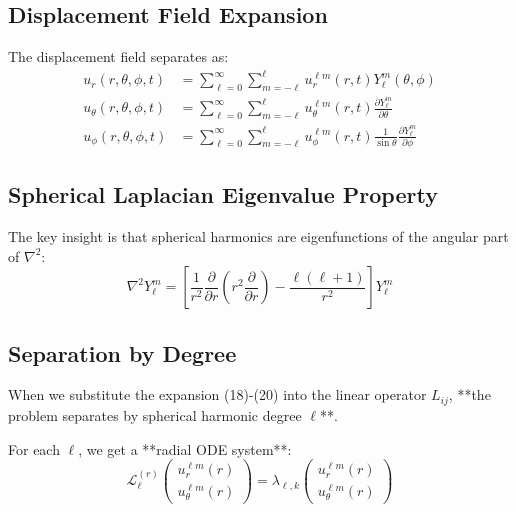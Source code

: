 \documentclass{article}
\begin{document}
\subsection{Displacement Field Expansion}

The displacement field separates as:
\begin{align}
u_r(r,\theta,\phi,t) &= \sum_{\ell=0}^{\infty} \sum_{m=-\ell}^{\ell} u_r^{\ell m}(r,t) Y_\ell^m(\theta,\phi) \\
u_\theta(r,\theta,\phi,t) &= \sum_{\ell=0}^{\infty} \sum_{m=-\ell}^{\ell} u_\theta^{\ell m}(r,t) \frac{\partial Y_\ell^m}{\partial \theta} \\
u_\phi(r,\theta,\phi,t) &= \sum_{\ell=0}^{\infty} \sum_{m=-\ell}^{\ell} u_\phi^{\ell m}(r,t) \frac{1}{\sin\theta}\frac{\partial Y_\ell^m}{\partial \phi}
\end{align}

\subsection{Spherical Laplacian Eigenvalue Property}

The key insight is that spherical harmonics are eigenfunctions of the angular part of $\nabla^2$:
\begin{equation}
\nabla^2 Y_\ell^m = \left[\frac{1}{r^2}\frac{\partial}{\partial r}\left(r^2\frac{\partial}{\partial r}\right) - \frac{\ell(\ell+1)}{r^2}\right] Y_\ell^m
\end{equation}

\subsection{Separation by Degree}

When we substitute the expansion (18)-(20) into the linear operator $L_{ij}$, **the problem separates by spherical harmonic degree $\ell$**.

For each $\ell$, we get a **radial ODE system**:
\begin{equation}
\mathcal{L}_\ell^{(r)} \begin{pmatrix} u_r^{\ell m}(r) \\ u_\theta^{\ell m}(r) \end{pmatrix} = \lambda_{\ell,k} \begin{pmatrix} u_r^{\ell m}(r) \\ u_\theta^{\ell m}(r) \end{pmatrix}
\end{equation}
\end{document}
